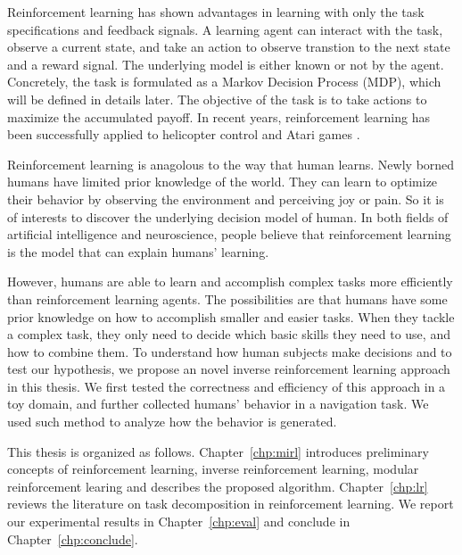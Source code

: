 Reinforcement learning has shown advantages in learning with only the task
specifications and feedback signals. A learning agent can interact with the
task, observe a current state, and take an action to observe
transtion to the next state and a reward signal. The underlying model is either
known or not by the agent. Concretely, the task is formulated as a
Markov Decision Process (MDP), which will be defined in details later.
The objective of the task is to take actions to maximize the accumulated payoff.
In recent years, reinforcement learning has been successfully applied to
helicopter control \cite{} and Atari games \cite{}.

Reinforcement learning is anagolous to the way that human learns. Newly borned
humans have limited prior knowledge of the world. They can learn to optimize
their behavior by observing the environment and perceiving joy or pain. So it is
of interests to discover the underlying decision model of human. In both fields
of artificial intelligence and neuroscience, people believe that reinforcement
learning is the model that can explain humans' learning.

However, humans are able to learn and accomplish complex tasks more efficiently than
reinforcement learning agents. The possibilities are that humans have some prior
knowledge on how to accomplish smaller and easier tasks. When they tackle a
complex task, they only need to decide which basic skills they need to use, and
how to combine them.
To understand how human subjects make decisions and to test our hypothesis, we
propose an novel inverse reinforcement learning approach in this thesis.
We first tested the correctness and efficiency of this approach in a toy domain,
and further collected humans' behavior in a navigation task. We used such method
to analyze how the behavior is generated.

This thesis is organized as follows. Chapter~\ref{chp:mirl} introduces 
preliminary concepts of reinforcement learning, inverse reinforcement learning,
modular reinforcement learing and describes the proposed algorithm.
Chapter~\ref{chp:lr} reviews the literature on task decomposition in
reinforcement learning. We report our experimental results in
Chapter~\ref{chp:eval} and conclude in Chapter~\ref{chp:conclude}.

